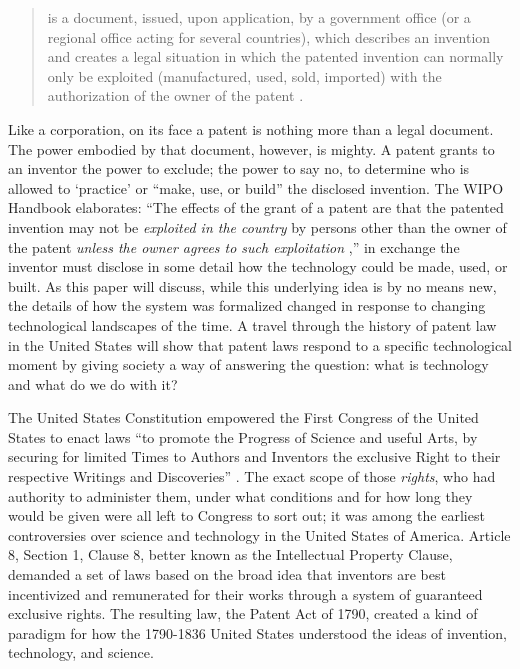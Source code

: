 \documentclass[pdftex,12pt,letterpaper]{article}
\begin{document}
\begin{quote}is a document, issued, upon application, by a government office (or a regional office acting for several countries), which describes an invention and creates a legal situation in which the patented invention can normally only be exploited (manufactured, used, sold, imported) with the authorization of the owner of the patent \autocite{WIPO}.
\end{quote}

Like a corporation, on its face a patent is nothing more than a legal document. The power embodied by that document, however, is mighty. A patent grants to an inventor the power to exclude; the power to say no, to determine who is allowed to `practice' or ``make, use, or build'' the disclosed invention. The WIPO Handbook elaborates: ``The effects of the grant of a patent are that the patented invention may not be \emph{exploited in the country} by persons other than the owner of the patent \emph{unless the owner agrees to such exploitation} \autocite[emphasis added]{WIPO},'' in exchange the inventor must disclose in some detail how the technology could be made, used, or built. As this paper will discuss, while this underlying idea is by no means new, the details of how the system was formalized changed in response to changing technological landscapes of the time. A travel through the history of patent law in the United States will show that patent laws respond to a specific technological moment by giving society a way of answering the question: what is technology and what do we do with it?

The United States Constitution empowered the First Congress of the United States to enact laws ``to promote the Progress of Science and useful Arts, by securing for limited Times to Authors and Inventors the exclusive Right to their respective Writings and Discoveries'' \autocite[ Art. 8, \S 1, cl. 8]{USConstitution}. The exact scope of those \textit{rights}, who had authority to administer them, under what conditions and for how long they would be given were all left to Congress to sort out; it was among the earliest controversies over science and technology in the United States of America. Article 8, Section 1, Clause 8, better known as the Intellectual Property Clause, demanded a set of laws based on the broad idea that inventors are best incentivized and remunerated for their works through a system of guaranteed exclusive rights. The resulting law, the Patent Act of 1790, created a kind of paradigm for how the 1790-1836 United States understood the ideas of invention, technology, and science. 
\end{document}
